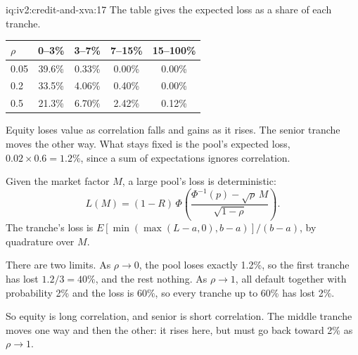 \begin{solution}{iq:iv2:credit-and-xva:17}
The table gives the expected loss as a share of each tranche.

\begin{center}
\begin{tabular}{lcccc}
\toprule
$\rho$ & 0--3\% & 3--7\% & 7--15\% & 15--100\% \\
\midrule
0.05 & 39.6\% & 0.33\% & 0.00\% & 0.00\% \\
0.2 & 33.5\% & 4.06\% & 0.40\% & 0.00\% \\
0.5 & 21.3\% & 6.70\% & 2.42\% & 0.12\% \\
\bottomrule
\end{tabular}
\end{center}

Equity loses value as correlation falls and gains as it rises. The senior tranche moves the other way. What stays fixed is the pool's expected loss, $0.02 \times 0.6 = 1.2\%$, since a sum of expectations ignores correlation.

Given the market factor $M$, a large pool's loss is deterministic:
\[
L(M) = (1 - R)\,\Phi\!\left(\frac{\Phi^{-1}(p) - \sqrt{\rho}\,M}{\sqrt{1 - \rho}}\right).
\]
The tranche's loss is $E[\min(\max(L - a, 0), b - a)]/(b - a)$, by quadrature over $M$.

There are two limits. As $\rho \to 0$, the pool loses exactly 1.2\%, so the first tranche has lost $1.2/3 = 40\%$, and the rest nothing. As $\rho \to 1$, all default together with probability 2\% and the loss is 60\%, so every tranche up to 60\% has lost 2\%.

So equity is long correlation, and senior is short correlation. The middle tranche moves one way and then the other: it rises here, but must go back toward 2\% as $\rho \to 1$.

\end{solution}

